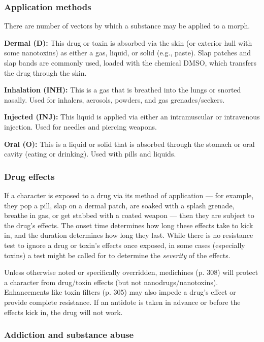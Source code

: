 {{\subsubsection{Application methods} 

There are number of vectors by which a substance may be applied to a morph. 

\textbf{Dermal (D):} This drug or toxin is absorbed via the skin (or exterior hull with some nanotoxins) as either a gas, liquid, or solid (e.g., paste). Slap patches and slap bands are commonly used, loaded with the chemical DMSO, which transfers the drug through the skin. 

\textbf{Inhalation (INH):} This is a gas that is breathed into the lungs or snorted nasally. Used for inhalers, aerosols, powders, and gas grenades/seekers. 

\textbf{Injected (INJ):} This liquid is applied via either an intramuscular or intravenous injection. Used for needles and piercing weapons. 

\textbf{Oral (O):} This is a liquid or solid that is absorbed through the stomach or oral cavity (eating or drinking). Used with pills and liquids. 

\subsubsection{Drug effects} 

If a character is exposed to a drug via its method of application --- for example, they pop a pill, slap on a dermal patch, are soaked with a splash grenade, breathe in gas, or get stabbed with a coated weapon --- then they are subject to the drug’s effects. The onset time determines how long these effects take to kick in, and the duration determines how long they last. While there is no resistance test to ignore a drug or toxin’s effects once exposed, in some cases (especially toxins) a test might be called for to determine the \emph{severity} of the effects. 

Unless otherwise noted or specifically overridden, medichines (p. 308) will protect a character from drug/toxin effects (but not nanodrugs/nanotoxins). Enhancements like toxin filters (p. 305) may also impede a drug’s effect or provide complete resistance. If an antidote is taken in advance or before the effects kick in, the drug will not work. 

\subsubsection{Addiction and substance abuse} 

}}
